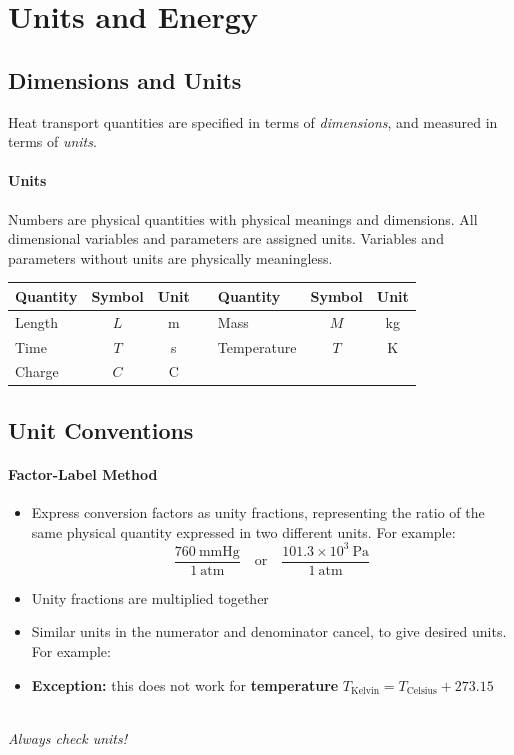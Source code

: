 \documentclass[12pt, a4paper]{article}
\numberwithin{equation}{subsection}
\begin{document}
\section{Units and Energy}
\subsection{Dimensions and Units}
Heat transport quantities are specified in terms of \textit{dimensions}, and measured in terms of \textit{units}.

\paragraph{Units} Numbers are physical quantities with physical meanings and dimensions. All dimensional variables and parameters are assigned units. Variables and parameters without units are physically meaningless.
\begin{tcolorbox}[title = 5 basic units used to describe all physical quantities]
\begin{center}
\begin{tabular}{lcc c lcc}
    \textbf{Quantity} & \textbf{Symbol} & \textbf{Unit} & & \textbf{Quantity} & \textbf{Symbol} & \textbf{Unit} \\
    \midrule
    Length & $L$ & m & & Mass & $M$ & kg \\
    Time & $T$ & s & & Temperature & $T$ & K \\
    Charge & $C$ & C & & & & \\
\end{tabular}
\end{center}
\end{tcolorbox}

\subsection{Unit Conventions}
\paragraph{Factor-Label Method}
\begin{itemize}
\item Express conversion factors as unity fractions, representing the ratio of the same physical quantity expressed in two different units. For example:
\[ 
    \frac{760 \ \mathrm{mmHg}}{1 \ \mathrm{atm}} \quad \text{or} \quad \frac{101.3 \times 10^3 \ \mathrm{Pa}}{1 \ \mathrm{atm}} 
\]
\item Unity fractions are multiplied together
\item Similar units in the numerator and denominator cancel, to give desired units. For example:
\item \textbf{Exception:} this does not work for \textbf{temperature} $T_{\mathrm{Kelvin}} = T_{\mathrm{Celsius}} + 273.15$
\end{itemize}
\ \\
\textit{Always check units!}
\end{document}
